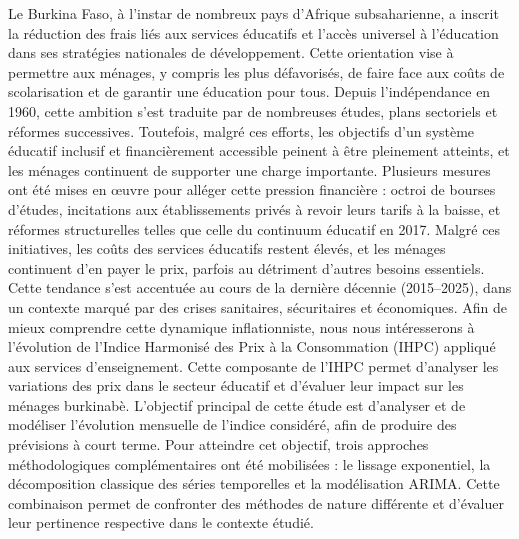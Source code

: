 \documentclass[
12pt,          %
a4paper,       %
oneside,       %
openright      %
]{report}
\begin{document}
	Le Burkina Faso, à l’instar de nombreux pays d’Afrique subsaharienne, a inscrit la réduction des frais liés aux services éducatifs et l’accès universel à l’éducation dans ses stratégies nationales de développement. Cette orientation vise à permettre aux ménages, y compris les plus défavorisés, de faire face aux coûts de scolarisation et de garantir une éducation pour tous. Depuis l’indépendance en 1960, cette ambition s’est traduite par de nombreuses études, plans sectoriels et réformes successives. Toutefois, malgré ces efforts, les objectifs d’un système éducatif inclusif et financièrement accessible peinent à être pleinement atteints, et les ménages continuent de supporter une charge importante.
	Plusieurs mesures ont été mises en œuvre pour alléger cette pression financière : octroi de bourses d’études, incitations aux établissements privés à revoir leurs tarifs à la baisse, et réformes structurelles telles que celle du continuum éducatif en 2017. Malgré ces initiatives, les coûts des services éducatifs restent élevés, et les ménages continuent d’en payer le prix, parfois au détriment d’autres besoins essentiels. Cette tendance s’est accentuée au cours de la dernière décennie (2015–2025), dans un contexte marqué par des crises sanitaires, sécuritaires et économiques.
	Afin de mieux comprendre cette dynamique inflationniste, nous nous intéresserons à l’évolution de l’Indice Harmonisé des Prix à la Consommation (IHPC) appliqué aux services d’enseignement. Cette composante de l’IHPC permet d’analyser les variations des prix dans le secteur éducatif et d’évaluer leur impact sur les ménages burkinabè.
	L’objectif principal de cette étude est d’analyser et de modéliser l’évolution mensuelle de l’indice considéré, afin de produire des prévisions à court terme. Pour atteindre cet objectif, trois approches méthodologiques complémentaires ont été mobilisées : le lissage exponentiel, la décomposition classique des séries temporelles et la modélisation ARIMA. Cette combinaison permet de confronter des méthodes de nature différente et d’évaluer leur pertinence respective dans le contexte étudié.
	
	
	
	
	
	\newpage
	
	
	
\end{document}
